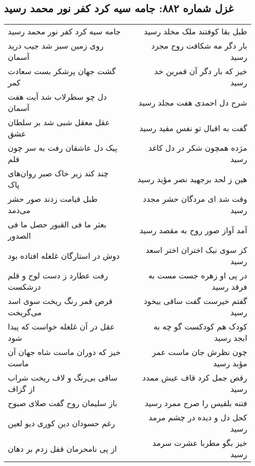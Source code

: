 \begin{center}
\section*{غزل شماره ۸۸۲: جامه سیه کرد کفر نور محمد رسید}
\label{sec:0882}
\begin{longtable}{l p{0.5cm} r}
جامه سیه کرد کفر نور محمد رسید
&&
طبل بقا کوفتند ملک مخلد رسید
\\
روی زمین سبز شد جیب درید آسمان
&&
بار دگر مه شکافت روح مجرد رسید
\\
گشت جهان پرشکر بست سعادت کمر
&&
خیز که بار دگر آن قمرین خد رسید
\\
دل چو سطرلاب شد آیت هفت آسمان
&&
شرح دل احمدی هفت مجلد رسید
\\
عقل معقل شبی شد بر سلطان عشق
&&
گفت به اقبال تو نفس مقید رسید
\\
پیک دل عاشقان رفت به سر چون قلم
&&
مژده همچون شکر در دل کاغد رسید
\\
چند کند زیر خاک صبر روان‌های پاک
&&
هین ز لحد برجهید نصر مؤید رسید
\\
طبل قیامت زدند صور حشر می‌دمد
&&
وقت شد ای مردگان حشر مجدد رسید
\\
بعثر ما فی القبور حصل ما فی الصدور
&&
آمد آواز صور روح به مقصد رسید
\\
دوش در استارگان غلغله افتاده بود
&&
کز سوی نیک اختران اختر اسعد رسید
\\
رفت عطارد ز دست لوح و قلم درشکست
&&
در پی او زهره جست مست به فرقد رسید
\\
قرص قمر رنگ ریخت سوی اسد می‌گریخت
&&
گفتم خیرست گفت ساقی بیخود رسید
\\
عقل در آن غلغله خواست که پیدا شود
&&
کودک هم کودکست گو چه به ابجد رسید
\\
خیز که دوران ماست شاه جهان آن ماست
&&
چون نظرش جان ماست عمر مؤبد رسید
\\
ساقی بی‌رنگ و لاف ریخت شراب از گزاف
&&
رقص جمل کرد قاف عیش ممدد رسید
\\
باز سلیمان روح گفت صلای صبوح
&&
فتنه بلقیس را صرح ممرد رسید
\\
رغم حسودان دین کوری دیو لعین
&&
کحل دل و دیده در چشم مرمد رسید
\\
از پی نامحرمان قفل زدم بر دهان
&&
خیز بگو مطربا عشرت سرمد رسید
\\
\end{longtable}
\end{center}
